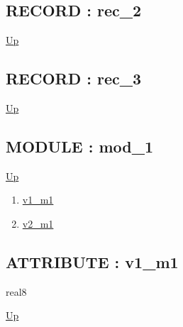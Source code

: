 \subsection*{RECORD : rec\_2}
\hypertarget{ecldoc:intest.example_2.rec_2}{}
\par
\begin{minipage}[t]{\textwidth}
\begin{flushleft}
  
\end{flushleft}
\end{minipage}
\hyperlink{ecldoc:intest.example_2}{Up} \\
\par
\par
\subsection*{RECORD : rec\_3}
\hypertarget{ecldoc:intest.example_2.rec_3}{}
\par
\begin{minipage}[t]{\textwidth}
\begin{flushleft}
  
\end{flushleft}
\end{minipage}
\hyperlink{ecldoc:intest.example_2}{Up} \\
\par
\par
\subsection*{MODULE : mod\_1}
\hypertarget{ecldoc:intest.example_2.mod_1}{}
\par
\begin{minipage}[t]{\textwidth}
\begin{flushleft}
  
\end{flushleft}
\end{minipage}
\hyperlink{ecldoc:intest.example_2}{Up} \\
\par
\par
\begin{enumerate}
\item \hyperlink{ecldoc:intest.example_2.mod_1.v1_m1}{v1\_m1}
\item \hyperlink{ecldoc:intest.example_2.mod_1.v2_m1}{v2\_m1}
\end{enumerate}
\subsection*{ATTRIBUTE : v1\_m1}
\hypertarget{ecldoc:intest.example_2.mod_1.v1_m1}{}
\par
\begin{minipage}[t]{\textwidth}
\begin{flushleft}
real8  
\end{flushleft}
\end{minipage}
\hyperlink{ecldoc:intest.example_2.mod_1}{Up} \\
\par
\par
